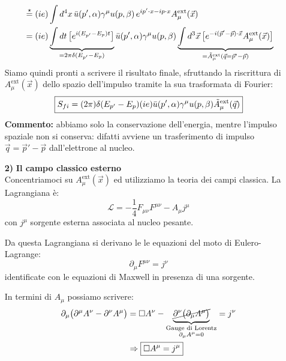 \documentclass[../main.tex]{subfiles}
\begin{document}
\begin{enumerate}
    \begin{align*}
       &\overset{\star}{=} (ie)\int d^4x\, \bar u( p',\alpha) \gamma^\mu u( p,\beta) \,e^{ip'\cdot x-ip\cdot x}A^\text{ext}_\mu(\Vec x)\\
       &=(ie) 
       \underbrace{\int dt\,\bigl[e^{i(E_{p'}-E_p)t}\bigr]}_{=2\pi \delta(E_{p'}-E_p)}
       \bar u( p',\alpha) \gamma^\mu u( p,\beta) 
       \underbrace{\int d^3\Vec x\,\bigl[e^{-i(\Vec p'-\Vec p)\cdot\Vec x}A^\text{ext}_\mu(\Vec x)\bigr]}_{=\Tilde{A}_\mu^\text{ext}(\Vec{q} = \Vec p'-\Vec p)}
    \end{align*}
    Siamo quindi pronti a scrivere il risultato finale, sfruttando la riscrittura di \(A^\text{ext}_\mu(\Vec x)\) dello spazio dell'impulso tramite la sua trasformata di Fourier:
    \begin{equation}
    \boxed{
        S_{fi}=(2\pi) \delta(E_{p'}-E_p) (ie)\bar u(p',\alpha) \gamma^\mu u( p,\beta)\Tilde{A}_\mu^\text{ext}(\Vec{q})
        }
        \label{eq:coulomb_scattering_amplitude_QED_final}
    \end{equation}
    \textbf{Commento:} abbiamo solo la conservazione dell'energia, mentre l'impulso spaziale non si conserva: difatti avviene un trasferimento di impulso $\Vec{q} = \Vec p'-\Vec p$ dall'elettrone al nucleo.

    \item[\textbf{2)}] \textbf{Il campo classico esterno} \\
    Concentriamoci su $A^\text{ext}_\mu(\Vec x)$ ed utilizziamo la teoria dei campi classica.
    La Lagrangiana è:
    \[
    \mathscr L = -\frac{1}{4}F_{\mu\nu}F^{\mu\nu} - A_\mu j^\mu
    \]
    con \(j^\mu\) sorgente esterna associata al nucleo pesante.

    Da questa Lagrangiana si derivano le le equazioni del moto di Eulero-Lagrange:
    \[
    \partial_\mu F^{\mu\nu} = j^\nu
    \]
    identificate con le equazioni di Maxwell in presenza di una sorgente.

    In termini di $A_\mu$ possiamo scrivere:
    \begin{align*}
        \partial_\mu \bigl(\partial^\mu A^\nu - \partial^\nu A^\mu\bigr) &= \Box A^\nu - \underbrace{\cancel{\partial^\nu\bigl(\partial_\mu A^\mu\bigr)}}_{\substack{\text{Gauge di Lorentz}\\ \partial_\mu A^\mu = 0}} = j^\nu \\
        &\Rightarrow \boxed{\Box A^\mu = j^\mu}
    \end{align*}


\end{enumerate}
\end{document}
